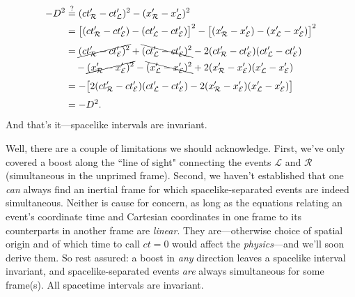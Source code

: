 \documentclass[12pt]{article}
\begin{document}
\begin{equation*}
\begin{aligned}
-D^2 &\stackrel{?}{=} (ct^{\prime}_{\mathcal{R}} - ct^{\prime}_{\mathcal{L}})^2 - (x^{\prime}_{\mathcal{R}} - x^{\prime}_{\mathcal{L}})^2 \\
&= \big[ ( ct^{\prime}_{\mathcal{R}} - ct^{\prime}_{\mathcal{E}}) - (ct^{\prime}_{\mathcal{L}} - ct^{\prime}_{\mathcal{E}} ) \big]^2 - \big[ ( x^{\prime}_{\mathcal{R}} - x^{\prime}_{\mathcal{E}} ) - ( x^{\prime}_{\mathcal{L}}  - x^{\prime}_{\mathcal{E}} ) \big]^2 \\[3pt]
&= \cancel{( ct^{\prime}_{\mathcal{R}} - ct^{\prime}_{\mathcal{E}})^2} + \bcancel{(ct^{\prime}_{\mathcal{L}} - ct^{\prime}_{\mathcal{E}} )^2} - 2 ( ct^{\prime}_{\mathcal{R}} - ct^{\prime}_{\mathcal{E}}) (ct^{\prime}_{\mathcal{L}} - ct^{\prime}_{\mathcal{E}} ) \\
& \quad - \cancel{( x^{\prime}_{\mathcal{R}} - x^{\prime}_{\mathcal{E}} )^2} - \bcancel{( x^{\prime}_{\mathcal{L}}  - x^{\prime}_{\mathcal{E}} )^2} + 2 ( x^{\prime}_{\mathcal{R}} - x^{\prime}_{\mathcal{E}} ) ( x^{\prime}_{\mathcal{L}}  - x^{\prime}_{\mathcal{E}} ) \\[3pt]
&= - \big[ 2 ( ct^{\prime}_{\mathcal{R}} - ct^{\prime}_{\mathcal{E}}) (ct^{\prime}_{\mathcal{L}} - ct^{\prime}_{\mathcal{E}} ) - 2 ( x^{\prime}_{\mathcal{R}} - x^{\prime}_{\mathcal{E}} ) ( x^{\prime}_{\mathcal{L}}  - x^{\prime}_{\mathcal{E}} ) \big] \\[3pt]
&= - D^2 .
\end{aligned}
\end{equation*}
And that's it---spacelike intervals are invariant.

Well, there are a couple of limitations we should acknowledge. First, we've only covered a boost along the ``line of sight" connecting the events $\mathcal{L}$ and $\mathcal{R}$ (simultaneous in the unprimed frame). Second, we haven't established that one \emph{can} always find an inertial frame for which spacelike-separated events are indeed simultaneous. Neither is cause for concern, as long as the equations relating an event's coordinate time and Cartesian coordinates in one frame to its counterparts in another frame are \emph{linear}. They are---otherwise choice of spatial origin and of which time to call $ct = 0$ would affect the \emph{physics}---and we'll soon derive them. So rest assured: a boost in \emph{any} direction leaves a spacelike interval invariant, and spacelike-separated events \emph{are} always simultaneous for some frame(s). All spacetime intervals are invariant.
\end{document}

